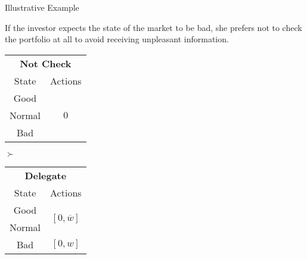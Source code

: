 \documentclass[usenames,dvipsnames,aspectratio=169,11pt, envcountsect]{beamer}
\begin{document}
\begin{frame}{Illustrative Example}

	If the investor expects the state of the market to be bad, she prefers not to check the portfolio at all to avoid receiving unpleasant information.

	\vfill

	\begin{table}[H]
		\centering
		\begin{minipage}{0.29\textwidth}
			\centering
			\begin{tabular}{c | c}
				\multicolumn{2}{c}{\textbf{Not Check}} \\
				State  & Actions                       \\
				\hline
				Good   & \multirow{3}{*}{ \( 0 \)}     \\
				Normal &                               \\
				Bad    &                               \\
			\end{tabular}
			\vspace{0.5cm} %
		\end{minipage}\hspace{0.3cm} %
		\( \succ \) %
		\begin{minipage}{0.29\textwidth}
			\centering
			\begin{tabular}{c | c}
				\multicolumn{2}{c}{\textbf{Delegate}}                                                                     \\
				State                        & Actions                                                                    \\
				\hline
				{\color{bleudefrance}Good}   & \multirow{2}{*}{{\color{bleudefrance}\( \left[0, \overline{w} \right] \)}} \\
				{\color{bleudefrance}Normal} &                                                                            \\
				Bad                          & \( \left[0, w \right]\)                                                    \\
			\end{tabular}
			\vspace{0.5cm} %
		\end{minipage}\hspace{0.3cm} %

\end{table}
\end{frame}
\end{document}
